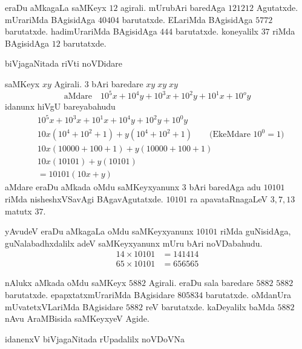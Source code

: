 
eraDu aMkagaLa saMKeyx $12$ agirali. mUrubAri baredAga $121212$ Agutatxde. mUrariMda BAgisidAga $40404$ barutatxde. ELariMda BAgisidAga $5772$ barutatxde. hadimUrariMda BAgisidAga $444$ barutatxde. koneyalilx $37$ riMda BAgisidAga $12$ barutatxde.

biVjagaNitada riVti noVDidare

saMKeyx $xy$ Agirali. $3$ bAri baredare $xy\;xy\;xy$
$$
\text{aMdare}\quad 10^{5}x+10^{4}y+10^{3}x+10^{2}y+10^{1}x+10^{o}y 
$$
idanunx hiVgU bareyabahudu
\begin{align*}
&10^{5}x+10^{3}x+10^{1}x +10^{4}y+10^{2}y+10^{0}y\\
&10x\left(10^4 +10^2+1\right) +y\left(10^4+10^2+1\right)\qquad \text{(EkeMdare $10^0 = 1$)}\\
&10x(10000+100+1) + y (10000+100+1)\\
&10x(10101) + y(10101)\\
&=10101 (10x+y)
\end{align*}
aMdare eraDu aMkada oMdu saMKeyxyanunx $3$ bAri baredAga adu $10101$ riMda nisheshxVSavAgi BAgavAgutatxde. $10101$ ra apavataRnagaLeV $3,7,13$ matutx $37$.

yAvudeV eraDu aMkagaLa oMdu saMKeyxyanunx $10101$ riMda guNisidAga, guNa\-labadhxdalilx adeV saMKeyxyanunx mUru bAri noVDabahudu.
\begin{align*}
14\times 10101 &= 141414\\
65\times 10101 &= 656565
 \end{align*} 


nAlukx aMkada oMdu saMKeyx $5882$ Agirali. eraDu sala baredare $5882$ $5882$ barutatxde. epapxtatxmUrariMda BAgisidare $805834$ barutatxde. oMdanUra mUvatetxVLariMda BAgisidare $5882$ reV barutatxde. kaDeyalilx baMda $5882$ nAvu AraMBisida saMKeyxyeV Agide.

idanenxV biVjagaNitada rUpadalilx noVDoVNa

